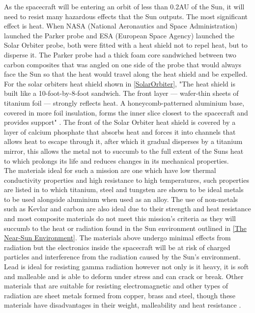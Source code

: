 \documentclass[12pt]{article}
\begin{document}
As the spacecraft will be entering an orbit of less than 0.2AU of the Sun, it will need to resist many hazardous effects that the Sun outputs. The most significant effect is heat. When NASA (National Aeronautics and Space Administration) launched the Parker probe and ESA (European Space Agency) launched the Solar Orbiter probe, both were fitted with a heat shield not to repel heat, but to disperse it. The Parker probe had a thick foam core sandwiched between two carbon composites that was angled on one side of the probe that would always face the Sun so that the heat would travel along the heat shield and be expelled. For the solar orbiters heat shield shown in \cref{SolarOrbiter}, "The heat shield is built like a 10-foot-by-8-foot sandwich. The front layer — wafer-thin sheets of titanium foil — strongly reflects heat. A honeycomb-patterned aluminium base, covered in more foil insulation, forms the inner slice closest to the spacecraft and provides support" \cite{SolarOrbiter}. The front of the Solar Orbiter heat shield is covered by a layer of calcium phosphate that absorbs heat and forces it into channels that allows heat to escape through it, after which it gradual disperses by a titanium mirror, this allows the metal not to succumb to the full extent of the Suns heat to which prolongs its life and reduces changes in its mechanical properties. \\

The materials ideal for such a mission are one which have low thermal conductivity properties and high resistance to high temperatures, such properties are listed in \cite{CRC} to which titanium, steel and tungsten are shown to be ideal metals to be used alongside aluminium when used as an alloy. The use of non-metals such as Kevlar and carbon are also ideal due to their strength and heat resistance and most composite materials do not meet this mission's criteria as they will succumb to the heat or radiation found in the Sun environment outlined in \cref{The Near-Sun Environment}. The materials above undergo minimal effects from radiation but the electronics inside the spacecraft will be at risk of charged particles and interference from the radiation caused by the Sun's environment. Lead is ideal for resisting gamma radiation however not only is it heavy, it is soft and malleable and is able to deform under stress and can crack or break. Other materials that are suitable for resisting electromagnetic and other types of radiation are sheet metals formed from copper, brass and steel, though these materials have disadvantages in their weight, malleability and heat resistance \cite{CRC}. \\
\end{document}
